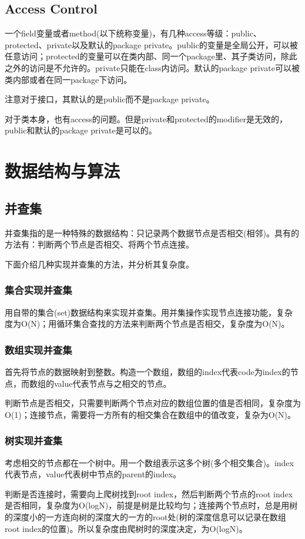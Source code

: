 \documentclass{article}
\begin{document}
	\subsection{Access Control}
	一个field变量或者method(以下统称变量)，有几种access等级：public、protected、private以及默认的package private。public的变量是全局公开，可以被任意访问；protected的变量可以在类内部、同一个package里、其子类访问，除此之外的访问是不允许的。private只能在class内访问。默认的package private可以被类内部或者在同一package下访问。
	
	注意对于接口，其默认的是public而不是package private。
	
	对于类本身，也有access的问题。但是private和protected的modifier是无效的，public和默认的package private是可以的。
	
	\section{数据结构与算法}
	\subsection{并查集}
	并查集指的是一种特殊的数据结构：只记录两个数据节点是否相交(相邻)。具有的方法有：判断两个节点是否相交、将两个节点连接。
	
	下面介绍几种实现并查集的方法，并分析其复杂度。
	\subsubsection{集合实现并查集}
	用自带的集合(set)数据结构来实现并查集。用并集操作实现节点连接功能，复杂度为O(N)；用循环集合查找的方法来判断两个节点是否相交，复杂度为O(N)。
	\subsubsection{数组实现并查集}
	首先将节点的数据映射到整数。构造一个数组，数组的index代表code为index的节点，而数组的value代表节点与之相交的节点。
	
	判断节点是否相交，只需要判断两个节点对应的数组位置的值是否相同，复杂度为O(1)；连接节点，需要将一方所有的相交集合在数组中的值改变，复杂为O(N)。
	
	\subsubsection{树实现并查集}
	考虑相交的节点都在一个树中。用一个数组表示这多个树(多个相交集合)。index代表节点，value代表树中节点的parent的index。
	
	判断是否连接时，需要向上爬树找到root index，然后判断两个节点的root index是否相同，复杂度为O(logN)，前提是树是比较均匀；连接两个节点时，总是用树的深度小的一方连向树的深度大的一方的root处(树的深度信息可以记录在数组root index的位置)。所以复杂度由爬树时的深度决定，为O(logN)。
	
\end{document}
